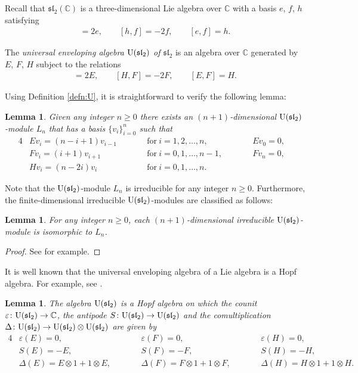 \documentclass[pdftex]{sigma}%
\def\C{\mathbb C}
\def\U{{\rm U}(\mathfrak{sl}_2)}
\def\e{\varepsilon}
\numberwithin{equation}{section}
\newtheorem{Lemma}[Theorem]{Lemma}
\begin{document}
Recall that $\mathfrak{sl}_2(\C)$ is a three-dimensional Lie algebra over $\C$ with a basis $e$, $f$, $h$ satisfying
\begin{gather*}
[h,e]=2e,\qquad
[h,f]=-2f,\qquad
[e,f]=h.
\end{gather*}

\begin{Definition}\label{defn:U}
The {\it universal enveloping algebra $\U$ of $\mathfrak{sl}_2$} is an algebra over $\C$ generated by $E$, $F$, $H$ subject to the relations
\begin{gather*}
[H,E]=2E,\qquad
[H,F]=-2F,\qquad
[E,F]=H.
\end{gather*}
\end{Definition}

Using Definition \ref{defn:U}, it is straightforward to verify the following lemma:

\begin{Lemma}\label{lem:Vn_U}
Given any integer $n\geq 0$ there exists an $(n+1)$-dimensional $\U$-module $L_n$
that has a basis $\{v_i\}_{i=0}^n$ such that
\begin{alignat*}{4}
&E v_i=(n-i+1) v_{i-1}\qquad&&
\text{for}\ i=1,2,\dots,n,\qquad&&
E v_0=0,&
\\
&F v_i=(i+1) v_{i+1}\qquad&&
\text{for}\ i=0,1,\dots,n-1,\qquad&&
F v_n=0,&
\\
&H v_i=(n-2i) v_i\qquad &&\text{for}\ i=0,1,\dots,n.&&&
\end{alignat*}
\end{Lemma}

Note that the $\U$-module $L_n$ is irreducible for any integer $n\geq 0$. Furthermore, the finite-dimensional irreducible $\U$-modules are classified as follows:

\begin{Lemma}\label{lem:classification_Umodule}
For any integer $n\geq 0$, each $(n+1)$-dimensional irreducible $\U$-module is isomorphic to $L_n$.
\end{Lemma}

\begin{proof}
See \cite[Section V.4]{kassel} for example.
\end{proof}

It is well known that the universal enveloping algebra of a Lie algebra is a Hopf algebra. For example, see \cite[Section 5]{Hopf65}.

\begin{Lemma}\label{lem:Hopf_U}
The algebra $\U$ is a Hopf algebra on which the counit $\e\colon \U\to \C$, the antipode $S\colon \U\to \U$ and the comultiplication $\Delta\colon \U\to \U\otimes \U$ are given by
\begin{alignat*}{4}
&\e(E)=0,\qquad&&
\e(F) =0,\qquad&&
\e(H)=0,&
\\
&S(E)=-E,\qquad&&
S(F) =-F,\qquad&&
S(H)=-H,&
\\
&\Delta(E)=E\otimes 1+1\otimes E,
\qquad&&
\Delta(F)=F\otimes 1+1\otimes F,
\qquad&&
\Delta(H)=H\otimes 1+1\otimes H.&
\end{alignat*}
\end{Lemma}
\end{document}
